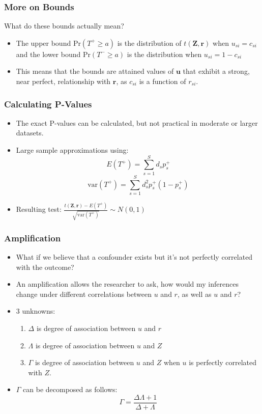 \documentclass{beamer}
\begin{document}
  \begin{frame}
    \frametitle{More on Bounds}
What do these bounds actually mean?

    \begin{itemize}
   \item<+-> The upper bound $\textrm{Pr}(T^+\geq a) $ is the
      distribution of $t(\mathbf{Z},\mathbf{r})$ when $u_{si}=c_{si}$
      and the lower bound $\textrm{Pr}(T^- \geq a)$ is the
      distribution when $u_{si}=1-c_{si}$
    \item<+-> This means that the bounds are attained values of
      $\mathbf{u}$ that exhibit a strong, near perfect, relationship
      with $\mathbf{r}$, as $c_{si}$ is a function of $r_{si}$. 
    \end{itemize}
  \end{frame}

  \begin{frame}
    \frametitle{Calculating P-Values}
    \begin{itemize}
    \item<+-> The \textrm{exact} P-values can be calculated, but not practical in
      moderate or larger datasets.
    \item<+-> Large sample approximations using: 
$$E(T^+)=\sum_{s=1}^Sd_sp^+_s$$
$$\textrm{var}(T^+)=\sum_{s=1}^Sd^2_sp^+_s(1-p^+_s)$$
\item<+-> Resulting test:
  $\frac{t(\mathbf{Z,r})-E(T^+)}{\sqrt{\textrm{var}(T^+)}}\sim N(0,1)$
    \end{itemize}
  \end{frame}


\begin{frame}[c]\frametitle{Amplification}
	\begin{itemize}
		\item<+-> 	What if we believe that a confounder exists but it's not perfectly correlated with the outcome? 
		\item<+-> An amplification allows the researcher to ask, how would my inferences change under different correlations between $u$ and $r$, as well as $u$ and $r$?
		\item<+-> 3 unknowns:
		\begin{enumerate}
			\item<+-> $\Delta$ is degree of association between $u$ and $r$
			\item<+-> $\Lambda$ is degree of association between $u$ and $Z$
			\item<+-> $\Gamma$ is degree of association between $u$ and $Z$ when $u$ is perfectly correlated with $Z$.   
		\end{enumerate}
		\item<+-> $\Gamma$ can be decomposed as follows:
		$$\Gamma = \frac{\Delta \Lambda + 1}{\Delta + \Lambda}$$
	\end{itemize}
 
	
\end{frame}
\end{document}
